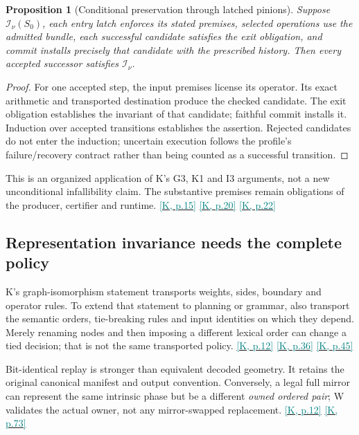 \documentclass[11pt,a4paper]{article}
\newcommand{\kref}[1]{\hyperlink{baseline.#1}{\textcolor{teal}{[K, p.#1]}}}
\theoremstyle{lpstyle}
\newtheorem{theorem}{Proposition}[section]
\newcommand{\Inv}{\mathcal I}
\begin{document}
\begin{theorem}[Conditional preservation through latched pinions]
Suppose $\Inv_\nu(S_0)$, each entry latch enforces its stated premises, selected operations use the admitted bundle, each successful candidate satisfies the exit obligation, and commit installs precisely that candidate with the prescribed history. Then every accepted successor satisfies $\Inv_\nu$.
\end{theorem}
\begin{proof}
For one accepted step, the input premises license its operator. Its exact arithmetic and transported destination produce the checked candidate. The exit obligation establishes the invariant of that candidate; faithful commit installs it. Induction over accepted transitions establishes the assertion. Rejected candidates do not enter the induction; uncertain execution follows the profile's failure/recovery contract rather than being counted as a successful transition.
\end{proof}
This is an organized application of K's G3, K1 and I3 arguments, not a new unconditional infallibility claim. The substantive premises remain obligations of the producer, certifier and runtime. \kref{15} \kref{20} \kref{22}

\subsection{Representation invariance needs the complete policy}
K's graph-isomorphism statement transports weights, sides, boundary and operator rules. To extend that statement to planning or grammar, also transport the semantic orders, tie-breaking rules and input identities on which they depend. Merely renaming nodes and then imposing a different lexical order can change a tied decision; that is not the same transported policy. \kref{12} \kref{36} \kref{45}

Bit-identical replay is stronger than equivalent decoded geometry. It retains the original canonical manifest and output convention. Conversely, a legal full mirror can represent the same intrinsic phase but be a different \emph{owned ordered pair}; W validates the actual owner, not any mirror-swapped replacement. \kref{12} \kref{73}
\end{document}
